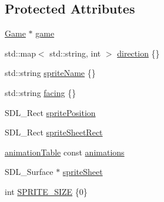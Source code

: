 \subsection*{Protected Attributes}
\begin{DoxyCompactItemize}
\item 
\hyperlink{classGame}{Game} $\ast$ \hyperlink{classSprite_a72c2faa2522184ea3cd81a1d50168a34}{game}
\item 
std\-::map$<$ std\-::string, int $>$ \hyperlink{classSprite_a660cef010618bdc48d706e0b3ab87177}{direction} \{\}
\item 
std\-::string \hyperlink{classSprite_a851a41894b0bbcb60a437fe82940fed9}{sprite\-Name} \{\}
\item 
std\-::string \hyperlink{classSprite_a582745bcb30f1910d056bf2ab5237e5b}{facing} \{\}
\item 
S\-D\-L\-\_\-\-Rect \hyperlink{classSprite_a2af2790211c2a3deb4a830741b0f8876}{sprite\-Position}
\item 
S\-D\-L\-\_\-\-Rect \hyperlink{classSprite_aac23050a3e3383f85f3cabbb874ff890}{sprite\-Sheet\-Rect}
\item 
\hyperlink{sprite_8h_a4e660753b3d87694743ccaf2bbc9150a}{animation\-Table} const \hyperlink{classSprite_aba52ded16f7623eb5f2ee63ece6ab896}{animations}
\item 
S\-D\-L\-\_\-\-Surface $\ast$ \hyperlink{classSprite_aa356e52e44c86d8d76cc3060eb41ae06}{sprite\-Sheet}
\item 
int \hyperlink{classSprite_a5dcf6606ddb6f6e8f85ad7d31536cc46}{S\-P\-R\-I\-T\-E\-\_\-\-S\-I\-Z\-E} \{0\}
\end{DoxyCompactItemize}


